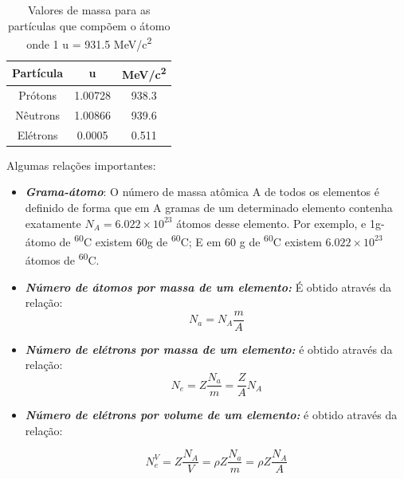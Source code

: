 \documentclass[11pt,a4paper]{article}
\newcounter{exemplo}
\begin{document}
            
            \begin{table}[h]
                \centering
                \caption{Valores de massa para as partículas que compõem o átomo onde 1 u = 931.5 \unit{MeV/c^2}}
                \begin{tabular}{c c c}
                    \toprule
                    Partícula &  u & \unit{MeV/c^2} \\
                    \midrule
                    Prótons & 1.00728 & 938.3 \\
                    Nêutrons & 1.00866 & 939.6 \\
                    Elétrons & 0.0005 & 0.511\\
                    \bottomrule
                    \bottomrule
                \end{tabular}
            \end{table}

            
            Algumas relações importantes:

            \begin{itemize}
                \item \textbf{\textit{\textcolor{CarnationPink}{Grama-átomo}}}: O número de massa atômica A de todos os elementos é definido de forma que em A gramas de um determinado  elemento contenha exatamente $N_A = 6.022 \times 10^{23}$ átomos desse elemento. Por exemplo, e 1g-átomo de \textsuperscript{60}C existem 60g de \textsuperscript{60}C; E em 60 g de \textsuperscript{60}C existem $6.022 \times 10^{23}$ átomos de \textsuperscript{60}C.
                
                \item \textbf{\textit{\textcolor{CarnationPink}{Número de átomos por massa de um elemento:}}} É obtido através da relação:
                    \begin{equation}
                        N_a = N_A \frac{m}{A} 
                    \end{equation}
                    

                \item \textbf{\textit{\textcolor{CarnationPink}{Número de elétrons por massa de um elemento:}}} é obtido através da relação:
                    \begin{equation}
                        N_e = Z \frac{N_a}{m} =  \frac{Z}{A} N_A
                    \end{equation}
                    

                \item \textbf{\textit{\textcolor{CarnationPink}{Número de elétrons por volume de um elemento:}}} é obtido através da relação:
                    
                    \begin{equation}
                        N_e^V = Z \frac{N_A}{V} = \rho Z \frac{N_a}{m} = \rho Z \frac{N_A}{A}
                    \end{equation}
                    
            \end{itemize}
              
\end{document}
